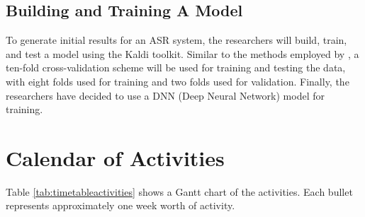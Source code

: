 \subsection{Building and Training A Model}
To generate initial results for an ASR system, the researchers will build, train, and test a model using the Kaldi toolkit. Similar to the methods employed by , a ten-fold cross-validation scheme will be used for training and testing the data, with eight folds used for training and two folds used for validation. Finally, the researchers have decided to use a DNN (Deep Neural Network) model for training.

\section{Calendar of Activities}


Table \ref{tab:timetableactivities} shows a Gantt chart of the activities.  Each bullet represents approximately
one week worth of activity.

%
%
\newcommand{\weekone}{\textbullet}
\newcommand{\weektwo}{\textbullet \textbullet}
\newcommand{\weekthree}{\textbullet \textbullet \textbullet}
\newcommand{\weekfour}{\textbullet \textbullet \textbullet \textbullet}

%
%

